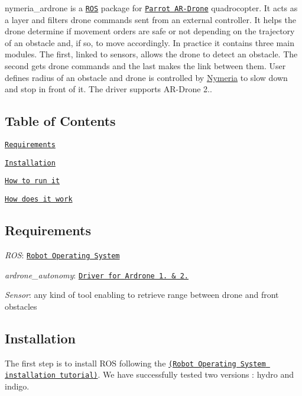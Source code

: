 nymeria\+\_\+ardrone is a \href{http://ros.org/}{\tt R\+O\+S} package for \href{http://ardrone2.parrot.com/}{\tt Parrot A\+R-\/\+Drone} quadrocopter. It acts as a layer and filters drone commands sent from an external controller. It helps the drone determine if movement orders are safe or not depending on the trajectory of an obstacle and, if so, to move accordingly. In practice it contains three main modules. The first, linked to sensors, allows the drone to detect an obstacle. The second gets drone commands and the last makes the link between them. User defines radius of an obstacle and drone is controlled by \hyperlink{class_nymeria}{Nymeria} to slow down and stop in front of it. The driver supports A\+R-\/\+Drone 2..

\subsection*{Table of Contents}


\begin{DoxyItemize}
\item \href{#requirements}{\tt Requirements}
\item \href{#installation}{\tt Installation}
\item \href{#how-to-run}{\tt How to run it}
\item \href{#how-does-it-work}{\tt How does it work}
\end{DoxyItemize}

\subsection*{Requirements}


\begin{DoxyItemize}
\item {\itshape R\+O\+S}\+: \href{http://wiki.ros.org/ROS/Installation}{\tt Robot Operating System}
\item {\itshape ardrone\+\_\+autonomy}\+: \href{https://github.com/AutonomyLab/ardrone_autonomy}{\tt Driver for Ardrone 1. \& 2.}
\item {\itshape Sensor}\+: any kind of tool enabling to retrieve range between drone and front obstacles
\end{DoxyItemize}

\subsection*{Installation}

The first step is to install R\+O\+S following the \href{http://wiki.ros.org/ROS/Installation}{\tt (Robot Operating System installation tutorial)}. We have successfully tested two versions \+: hydro and indigo.

